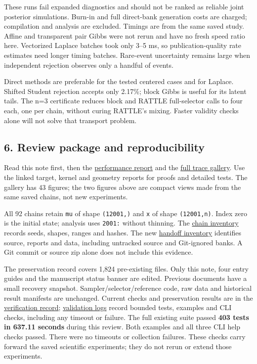 \documentclass[
  10pt,
]{article}
\begin{document}
\textdagger{} These runs fail expanded diagnostics and should not be ranked as
reliable joint posterior simulations. Burn-in and full direct-bank
generation costs are charged; compilation and analysis are excluded.
Timings are from the same saved study. Affine and transparent pair Gibbs
were not rerun and have no fresh speed ratio here. Vectorized Laplace
batches took only 3--5 ms, so publication-quality rate estimates need
longer timing batches. Rare-event uncertainty remains large when
independent rejection observes only a handful of events.

Direct methods are preferable for the tested centered cases and for
Laplace. Shifted Student rejection accepts only 2.17\%; block Gibbs is
useful for its latent tails. The n=3 certificate reduces block and
RATTLE full-selector calls to four each, one per chain, without curing
RATTLE's mixing. Faster validity checks alone will not solve that
transport problem.

\subsection{6. Review package and
reproducibility}\label{review-package-and-reproducibility}

Read this note first, then the
\href{location_only_performance_comparison.md}{performance report} and
the
\href{evidence/location_chain_diagnostics_2026-10-12/index.html}{full
trace gallery}. Use the linked target, kernel and geometry reports for
proofs and detailed tests. The gallery has 43 figures; the two figures
above are compact views made from the same saved chains, not new
experiments.

All 92 chains retain \texttt{mu} of shape \texttt{(12001,)} and
\texttt{x} of shape \texttt{(12001,n)}. Index zero is the initial state;
analysis uses \texttt{2001:} without thinning. The
\href{evidence/location_chain_diagnostics_2026-10-12/chain_inventory.csv}{chain
inventory} records seeds, shapes, ranges and hashes. The new
\href{evidence/location_review_handoff_2026-10-12/handoff_inventory.csv}{handoff
inventory} identifies source, reports and data, including untracked
source and Git-ignored banks. A Git commit or source zip alone does not
include this evidence.

The preservation record covers 1,824 pre-existing files. Only this note,
four entry guides and the manuscript status banner are edited. Previous
documents have a small recovery snapshot. Sampler/selector/reference
code, raw data and historical result manifests are unchanged. Current
checks and preservation results are in the
\href{evidence/location_review_handoff_2026-10-12/verification.json}{verification
record};
\href{evidence/location_review_handoff_2026-10-12/validation/}{validation
logs} record bounded tests, examples and CLI checks, including any
timeout or failure. The full existing suite passed \textbf{403 tests in
637.11 seconds} during this review. Both examples and all three CLI help
checks passed. There were no timeouts or collection failures. These
checks carry forward the saved scientific experiments; they do not rerun
or extend those experiments.
\end{document}
